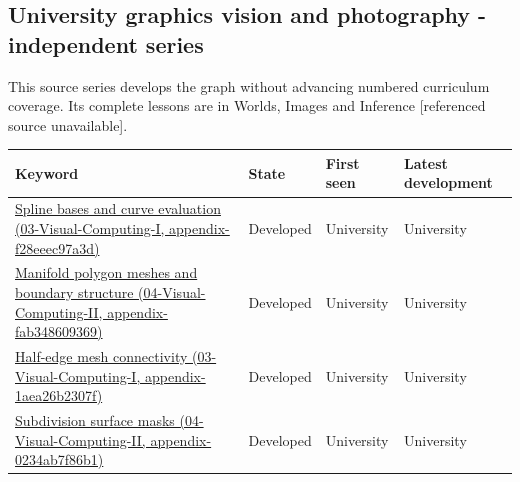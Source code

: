 \subsection{University graphics vision and photography - independent series}\label{appendix-a6d556a4ef50-university-graphics-vision-and-photography---independent-series}

This source series develops the graph without advancing numbered curriculum coverage. Its complete lessons are in {Worlds, Images and Inference {[}referenced source unavailable{]}}.

{\def\LTcaptype{none} %
\begin{longtable}[]{@{}
  >{\raggedright\arraybackslash}p{}
  >{\raggedright\arraybackslash}p{}
  >{\raggedright\arraybackslash}p{}
  >{\raggedright\arraybackslash}p{}@{}}
\toprule\noalign{}
\begin{minipage}[b]{\linewidth}\raggedright
Keyword
\end{minipage} & \begin{minipage}[b]{\linewidth}\raggedright
State
\end{minipage} & \begin{minipage}[b]{\linewidth}\raggedright
First seen
\end{minipage} & \begin{minipage}[b]{\linewidth}\raggedright
Latest development
\end{minipage} \\
\midrule\noalign{}
\endhead
\bottomrule\noalign{}
\endlastfoot
\href{../03-Visual-Computing-I/main.pdf\#nameddest=appendix-f28eeec97a3d}{Spline bases and curve evaluation (03-Visual-Computing-I, appendix-f28eeec97a3d)} & Developed & University & University \\
\href{../04-Visual-Computing-II/main.pdf\#nameddest=appendix-fab348609369}{Manifold polygon meshes and boundary structure (04-Visual-Computing-II, appendix-fab348609369)} & Developed & University & University \\
\href{../03-Visual-Computing-I/main.pdf\#nameddest=appendix-1aea26b2307f}{Half-edge mesh connectivity (03-Visual-Computing-I, appendix-1aea26b2307f)} & Developed & University & University \\
\href{../04-Visual-Computing-II/main.pdf\#nameddest=appendix-0234ab7f86b1}{Subdivision surface masks (04-Visual-Computing-II, appendix-0234ab7f86b1)} & Developed & University & University \\

\end{longtable}}
